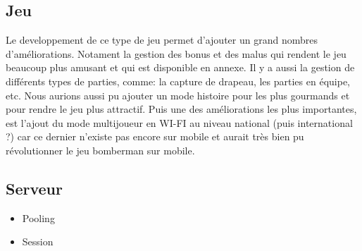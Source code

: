 \subsection{Jeu}

Le developpement de ce type de jeu permet d'ajouter un grand nombres d'améliorations. Notament la gestion des bonus et des malus qui rendent le jeu beaucoup plus amusant et qui est disponible en annexe. Il y a aussi la gestion de différents types de parties, comme: la capture de drapeau,  les parties en équipe, etc. Nous aurions aussi pu ajouter un mode histoire pour les plus gourmands et pour rendre le jeu plus attractif. Puis une des améliorations les plus importantes, est l'ajout du mode multijoueur en WI-FI au niveau national (puis international ?) car ce dernier n'existe pas encore sur mobile et aurait très bien pu révolutionner le jeu bomberman sur mobile.


\subsection{Serveur}
	\begin{itemize}
		\item{Pooling}
		\item{Session}
	\end{itemize}